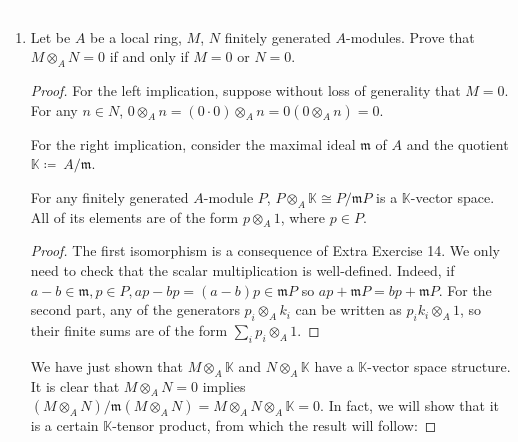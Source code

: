 \begin{problem}\textcolor{white}{.}

    \begin{enumerate}[label=(\theproblem.\arabic*),ref=\theproblem.\arabic*]
        \item Let be $A$ be a local ring, $M$, $N$ finitely generated $A$-modules.
        Prove that $M \otimes_A N = 0$ if and only if $M = 0$ or $N = 0$.
            \begin{sol}
                \begin{proof}
                    For the left implication, suppose without loss of generality that $M = 0$.
                    For any $n \in N$, $0 \otimes_A n = (0\cdot0) \otimes_A n = 0(0 \otimes_A n) = 0$.

                    For the right implication, consider the maximal ideal $\mathfrak{m}$ of $A$
                    and the quotient $\mathbb{K}\coloneqq~A/\mathfrak{m}$.
                    \begin{claim}
                        For any finitely generated $A$-module $P$, 
                        $P \otimes_A \mathbb{K} \cong P/\mathfrak{m}P$ is a $\mathbb{K}$-vector space.
                        All of its elements are of the form $p \otimes_{A} 1$, where $p \in P$.
                        \begin{proof}
                            The first isomorphism is a consequence of Extra Exercise 14.
                            We only need to check that the scalar multiplication is well-defined.
                            Indeed, if $a - b \in \mathfrak{m}, p \in P, ap - bp = (a-b) p \in \mathfrak{m}P$
                            so $ap + \mathfrak{m}P = bp + \mathfrak{m}P$.
                            For the second part, any of the generators $p_i \otimes_{A} k_i$ can be written as
                            $p_i k_i \otimes_A 1$, so their finite sums are of the form $\sum_{i}p_i  \otimes_{A} 1$.
                        \end{proof}
                    \end{claim}

                    We have just shown that $M \otimes_A \mathbb{K}$ and $N \otimes_A \mathbb{K}$ have a $\mathbb{K}$-vector space structure.
                    It is clear that $M \otimes_A N = 0$ implies $(M \otimes_A N) / \mathfrak{m}(M \otimes_A N) = M \otimes_A  N \otimes_A \mathbb{K} = 0$.
                    In fact, we will show that it is a certain $\mathbb{K}$-tensor product, from which the result will follow:


\end{proof}
\end{sol}
\end{enumerate}
\end{problem}
